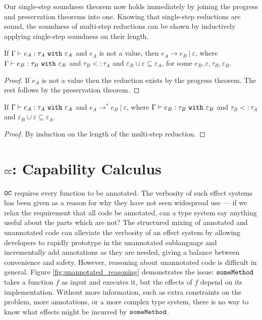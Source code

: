 Our single-step soundness theorem now holds immediately by joining the progress and preservation theorems into one. Knowing that single-step reductions are sound, the soundness of multi-step reductions can be shown by inductively applying single-step soundness on their length.

\begin{theorem}
If $ \Gamma \vdash  e_A:  \tau_A~\mathtt{with}~ \varepsilon_A$ and $ e_A$ is not a value, then $e_A \longrightarrow e_B~|~\varepsilon$, where $ \Gamma \vdash e_B:  \tau_B~\mathtt{with}~ \varepsilon_B$ and $ \tau_B <:  \tau_A$ and $\varepsilon_B \cup \varepsilon \subseteq \varepsilon_A$, for some $e_B, \varepsilon, \tau_B, \varepsilon_B$.
\end{theorem}
\begin{proof}
If $ e_A$ is not a value then the reduction exists by the progress theorem. The rest follows by the preservation theorem.
\end{proof}

\begin{theorem}
If $ \Gamma \vdash  e_A:  \tau_A~\mathtt{with}~ \varepsilon_A$ and $e_A \longrightarrow^{*} e_B~|~\varepsilon$, where $\Gamma \vdash e_B: \tau_B~\mathtt{with}~ \varepsilon_B$ and $ \tau_B <: \tau_A$ and $\varepsilon_B \cup \varepsilon \subseteq \varepsilon_A$.
\end{theorem}

\begin{proof} By induction on the length of the multi-step reduction.
\end{proof}


\section{$\mathtt{CC}$: Capability Calculus}

$\mathtt{OC}$ requires every function to be annotated. The verbosity of such effect systems has been given as a reason for why they have not seen widespread use \cite{rytz2012} --- if we relax the requirement that all code be annotated, can a type system say anything useful about the parts which are not? The structured mixing of annotated and unannotated code can alleviate the verbosity of an effect system by allowing developers to rapidly prototype in the unannotated sublanguage and incrementally add annotations as they are needed, giving a balance between convenience and safety. However, reasoning about unannotated code is difficult in general. Figure \ref{fig:unannotated_reasoning} demonstrates the issue: $\mathtt{someMethod}$ takes a function $f$ as input and executes it, but the effects of $f$ depend on its implementation. Without more information, such as extra constraints on the problem, more annotations, or a more complex type system, there is no way to know what effects might be incurred by $\mathtt{someMethod}$.


